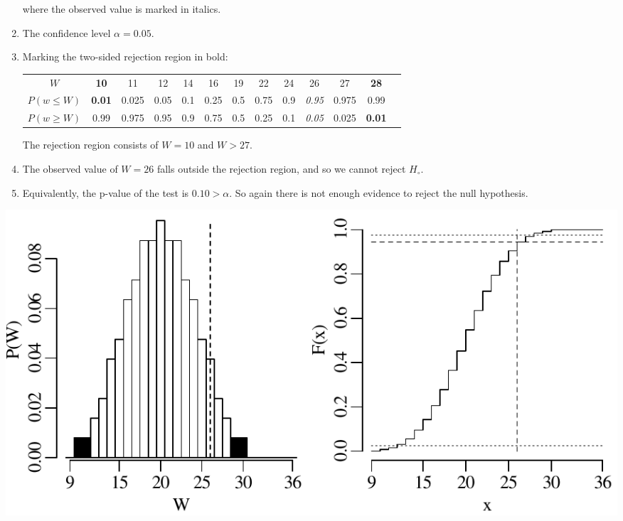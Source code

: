 \begin{enumerate}
  \noindent where the observed value is marked in italics.
  
\item The confidence level $\alpha = 0.05$.

\item Marking the two-sided rejection region in bold:
  
  \begin{center}
    \begin{tabular}{c|c@{\gap}c@{\gap}c@{\gap}c@{\gap}
        c@{\gap}c@{\gap}c@{\gap}c@{\gap}c@{\gap}c@{\gap}c@{\gap}c}
      $W$ & \textbf{10} & 11 & 12 & 14 & 16 & 19 & 22 & 24 & 26 &
      27 & \textbf{28} \\
      $P(w\leq{W})$ & \textbf{0.01} & 0.025 & 0.05 & 0.1 & 0.25 &
      0.5 & 0.75 & 0.9 & \emph{0.95} & 0.975 & 0.99 \\
      $P(w\geq{W})$ & 0.99 & 0.975 & 0.95 & 0.9 & 0.75 & 0.5 &
      0.25 & 0.1 & \emph{0.05} & 0.025 & \textbf{0.01}
    \end{tabular}
  \end{center}

  The rejection region consists of $W={10}$ and $W>{27}$.

\item The observed value of $W=26$ falls outside the rejection region,
  and so we cannot reject $H_\circ$.

\item Equivalently, the p-value of the test is $0.10>\alpha$.  So
  again there is not enough evidence to reject the null hypothesis.
  
\end{enumerate}

\noindent\begin{minipage}[t][][b]{.6\textwidth}
  \includegraphics[width=\textwidth]{../figures/wilcox.pdf}\\
\end{minipage}
\begin{minipage}[t][][t]{.4\textwidth}
  \label{fig:wilcox}
\end{minipage}

